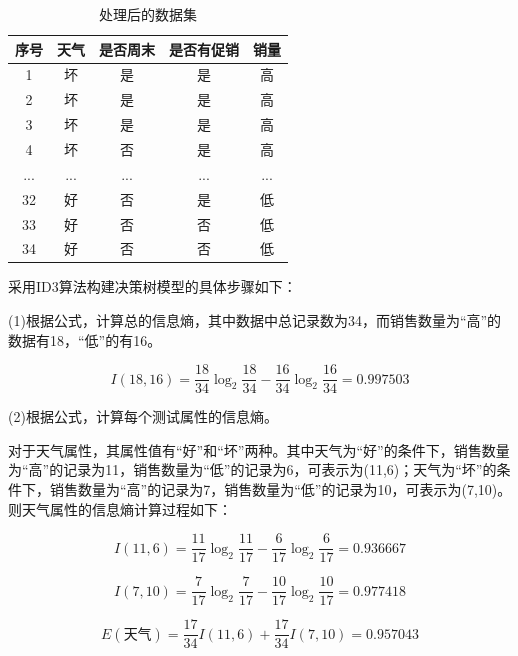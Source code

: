 \begin{table}[thbp]\footnotesize
	\caption{处理后的数据集}
	\begin{center}
		\begin{tabular}{c|c|c|c|c}
			\hline  序号& 天气 & 是否周末&是否有促销&  销量\\ 
			\hline 1 & 坏 & 是&是&高 \\ 
			\hline 2 & 坏 & 是&是&高 \\ 
			\hline 3 & 坏 & 是&是&高 \\ 
			\hline 4 & 坏 & 否&是&高 \\ 
			\hline ...& ... & ...&...&... \\ 
			\hline 32 & 好 & 否&是&低 \\ 
			\hline 33 & 好 & 否&否&低 \\ 
			\hline 34 & 好 & 否&否&低 \\ 
			\hline
		\end{tabular} 
	\end{center}
\end{table}

采用ID3算法构建决策树模型的具体步骤如下：

(1)根据公式，计算总的信息熵，其中数据中总记录数为34，而销售数量为“高”的数据有18，“低”的有16。

\begin{equation}
I(18,16)=\frac{18}{34}\log_2\frac{18}{34}-\frac{16}{34}\log_2\frac{16}{34}=0.997503
\end{equation}

(2)根据公式，计算每个测试属性的信息熵。

对于天气属性，其属性值有“好”和“坏”两种。其中天气为“好”的条件下，销售数量为“高”的记录为11，销售数量为“低”的记录为6，可表示为(11,6)；天气为“坏”的条件下，销售数量为“高”的记录为7，销售数量为“低”的记录为10，可表示为(7,10)。则天气属性的信息熵计算过程如下：

\begin{equation}
I(11,6)=\frac{11}{17}\log_2\frac{11}{17}-\frac{6}{17}\log_2\frac{6}{17}=0.936667
\end{equation}

\begin{equation}
I(7,10)=\frac{7}{17}\log_2\frac{7}{17}-\frac{10}{17}\log_2\frac{10}{17}=0.977418
\end{equation}

\begin{equation}
E(\mbox{天气})=\frac{17}{34}I(11,6)+\frac{17}{34}I(7,10)=0.957043
\end{equation}

